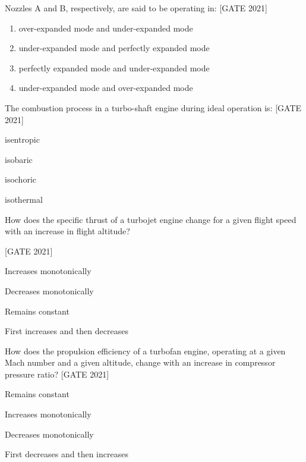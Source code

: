 Nozzles A and B, respectively, are said to be operating in: 
 \hfill{[GATE 2021]}\begin{enumerate}
    
        \item over-expanded mode and under-expanded mode
        \item under-expanded mode and perfectly expanded mode
        \item perfectly expanded mode and under-expanded mode
        \item under-expanded mode and over-expanded mode\\
   
\end{enumerate}
\item The combustion process in a turbo-shaft engine during ideal operation is: \hfill{[GATE 2021]}\begin{enumerate} 
    
     \begin{multicols}{4}
        \item isentropic
        \item isobaric
        \item isochoric
        \item isothermal
    \end{multicols}
\end{enumerate} 
\item How does the specific thrust of a turbojet engine change for a given flight speed with an increase in flight altitude?

\hfill{[GATE 2021]}\begin{enumerate}\begin{multicols}{2}
        \item Increases monotonically
        \item Decreases monotonically
        \item Remains constant
        \item First increases and then decreases
    \end{multicols}
\end{enumerate}

\vspace{1cm}

\item How does the propulsion efficiency of a turbofan engine, operating at a given Mach number and a given altitude, change with an increase in compressor pressure ratio?
\hfill{[GATE 2021]}\begin{enumerate} 
     \begin{multicols}{2}
        \item Remains constant
        \item Increases monotonically
        \item Decreases monotonically
        \item First decreases and then increases
    \end{multicols}
\end{enumerate}

